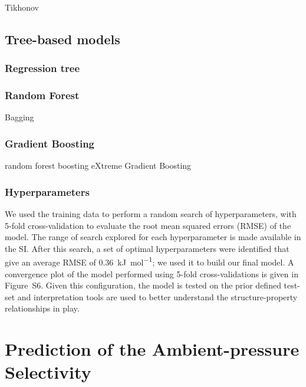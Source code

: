 \documentclass[main]{subfiles}
\begin{document}

Tikhonov






\subsection{Tree-based models}

\subsubsection{Regression tree}

\subsubsection{Random Forest}

Bagging

\subsubsection{Gradient Boosting}


random forest 
boosting
eXtreme Gradient Boosting

\subsubsection{Hyperparameters}


We used the training data to perform a random search of hyperparameters, with 5-fold cross-validation to evaluate the root mean squared errors (RMSE) of the model. The range of search explored for each hyperparameter is made available in the SI. After this search, a set of optimal hyperparameters were identified that give an average RMSE of \SI{0.36}{\kilo\joule\per\mole}; we used it to build our final model. A convergence plot of the model performed using 5-fold cross-validations is given in Figure~S6. Given this configuration, the model is tested on the prior defined test-set and interpretation tools are used to better understand the structure-property relationships in play.

\section{Prediction of the Ambient-pressure Selectivity}
\end{document}
